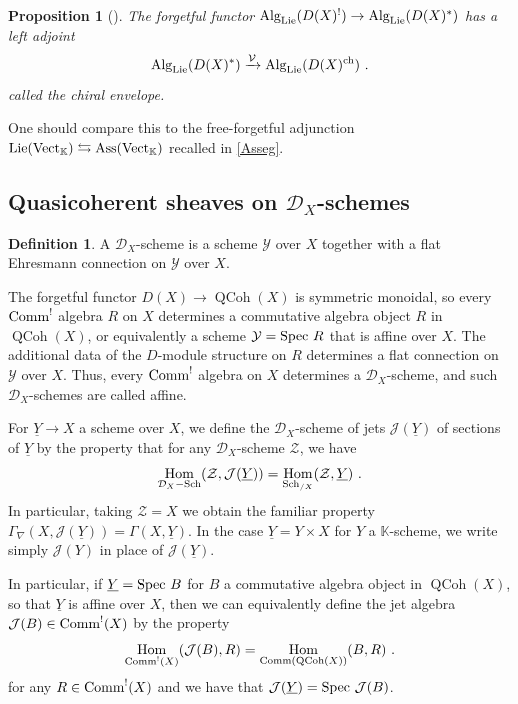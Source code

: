 \documentclass[11pt]{amsart}
\numberwithin{equation}{section}
\newtheorem{prop}[theo]{Proposition}
\theoremstyle{definition}
\newtheorem{defn}[theo]{Definition}
\newcommand{\bb}{\mathbb}
\newcommand{\mc}{\mathcal}
\DeclareMathOperator{\Hom}{Hom}
\DeclareMathOperator{\Vect}{Vect}
\newcommand{\ik}{{\bb K}}
\newcommand{\Spec}{{\textup{Spec\ }}}
\newcommand{\Alg}{{\textup{Alg}}}
\newcommand{\Comm}{{\textup{Comm}}}
\newcommand{\Lie}{{\textup{Lie}}}
\newcommand{\ch}{{\textup{ch}}}
\newcommand{\Ass}{{\textup{Ass}}}
\newcommand{\0}{{\textbf{0}}}
\newcommand{\Sch}{{\textup{Sch}}}
\DeclareMathOperator{\QC}{QCoh}
\newcommand{\DD}{{D}}
\def\VV{{\mc V}}
\def\ch{{\rm ch}}
\begin{document}
\begin{prop}[\cite{BD1}]\label{prop:chiral envelope}
	The forgetful functor $\Alg_{\Lie}(\DD(X)^!)\rightarrow \Alg_{\Lie}(\DD(X)^*)$ has a left adjoint
	\[
	\Alg_{\Lie}(\DD(X)^*)\xrightarrow{\VV} \Alg_{\Lie}(\DD(X)^\ch)~.
	\]
	called the chiral envelope.
\end{prop}
One should compare this to the free-forgetful adjunction $\Lie(\Vect_\ik)\leftrightarrows \Ass(\Vect_\ik)$ recalled in \ref{Asseg}.

\subsection{Quasicoherent sheaves on $\mc D_X$-schemes}

\begin{defn}
A $\mc D_X$-scheme is a scheme $\mc Y$ over $X$ together with a flat Ehresmann connection on $\mc Y$ over $X$.
\end{defn}

The forgetful functor $\DD(X)\to \QC(X)$ is symmetric monoidal, so every $\Comm^!$ algebra $R$ on $X$ determines a commutative algebra object $R$ in $\QC(X)$, or equivalently a scheme $\mc Y = \Spec R$ that is affine over $X$. The additional data of the $\DD$-module structure on $R$ determines a flat connection on $\mc Y$ over $X$. Thus, every $\Comm^!$ algebra on $X$ determines a $\mc D_X$-scheme, and such $\mc D_X$-schemes are called affine.



For $\underline{Y} \to X$ a scheme over $X$, we define the $\mc D_X$-scheme of jets $\mc J(\underline{Y})$ of sections of $\underline{Y}$ by the property that for any $\mc D_X$-scheme $\mc Z$, we have
\[ \Hom_{\mc D_X-\Sch}(\mc Z, \mc J(\underline{Y})) = \Hom_{\Sch_{/X}}(\mc Z, \underline{Y}) \ .\]
In particular, taking $\mc Z=X$ we obtain the familiar property $\Gamma_\nabla(X,\mc J(\underline{Y}))=\Gamma(X,\underline{Y})$. In the case $\underline{Y}=Y\times X$ for $Y$ a $\bb K$-scheme, we write simply $\mc J(Y)$ in place of $\mc J(\underline{Y})$.


In particular, if $\underline{Y}=\Spec B$ for $B$ a commutative algebra object in $\QC(X)$, so that $\underline{Y}$ is affine over $X$, then we can equivalently define the jet algebra $\mc J(B)\in \Comm^!(X)$ by the property
\begin{equation}\label{affinejetadjeqn}
	 \Hom_{\Comm^!(X)}( \mc J(B),R) = \Hom_{\Comm(\QC(X))}(B,R) \ .  
\end{equation}
 for any $R\in \Comm^!(X)$ and we have that $\mc J(\underline{Y})=\Spec \mc J(B)$.
\end{document}
